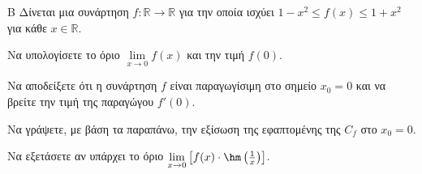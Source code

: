 \begin{thema}{Β}
Δίνεται μια συνάρτηση $f: \mathbb{R} \to \mathbb{R}$ για την οποία ισχύει $1 - x^2 \le f(x) \le 1 + x^2$ για κάθε $x \in \mathbb{R}$.
\begin{erwthma}
  \item Να υπολογίσετε το όριο $\lim\limits_{x \to 0} f(x)$ και την τιμή $f(0)$.
  \item Να αποδείξετε ότι η συνάρτηση $f$ είναι παραγωγίσιμη στο σημείο $x_0=0$ και να βρείτε την τιμή της παραγώγου $f'(0)$.
  \item Να γράψετε, με βάση τα παραπάνω, την εξίσωση της εφαπτομένης της $C_f$ στο $x_0=0$.
  \item Να εξετάσετε αν υπάρχει το όριο $\lim\limits_{x \to 0} \left[ f(x) \cdot \hm\left(\frac{1}{x}\right) \right]$.
\end{erwthma}
\end{thema}
